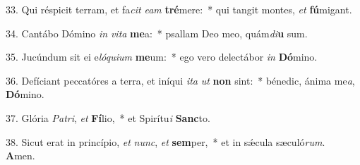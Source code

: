 33. Qui réspicit terram, et fa\textit{cit} \textit{e}\textit{am} \textbf{tré}mere:~*  qui tangit montes, \textit{et} \textbf{fú}migant.\

34. Cantábo Dómino \textit{in} \textit{vi}\textit{ta} \textbf{me}a:~*  psallam Deo meo, quám\textit{di}\textbf{u} sum.\

35. Jucúndum sit ei e\textit{ló}\textit{qui}\textit{um} \textbf{me}um:~*  ego vero delectábor \textit{in} \textbf{Dó}mino.\

36. Defíciant peccatóres a terra, et iníqui \textit{i}\textit{ta} \textit{ut} \textbf{non} sint:~*  bénedic, ánima me\textit{a}, \textbf{Dó}mino.\

37. Glória \textit{Pa}\textit{tri}, \textit{et} \textbf{Fí}lio,~*  et Spirítu\textit{i} \textbf{Sanc}to.\

38. Sicut erat in princípio, \textit{et} \textit{nunc}, \textit{et} \textbf{sem}per,~*  et in sǽcula sæculó\textit{rum}. \textbf{A}men.\

